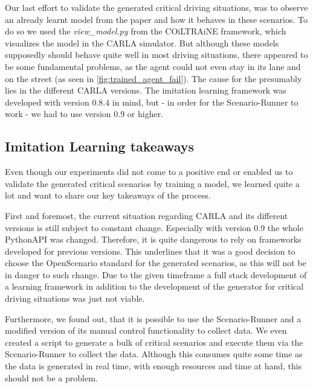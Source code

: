 \documentclass[conference, a4paper, 11pt]{IEEEtran}
\begin{document}
Our last effort to validate the generated critical driving situations, was to observe an already learnt model from the paper  \cite{Codevilla:OnOfflineEvaluation} and how it behaves in these scenarios. To do so we used the \textit{view\_model.py} from the COiLTRAiNE framework, which visualizes the model in the CARLA simulator. But although these models supposedly should behave quite well in most driving situations, there appeared to be some fundamental problems, as the agent could not even stay in its lane and on the street (as seen in \autoref{fig:trained_agent_fail}). The cause for the presumably lies in the different CARLA versions. The imitation learning framework was developed with version 0.8.4 in mind, but - in order for the Scenario-Runner to work - we had to use version 0.9 or higher.

\subsection{Imitation Learning takeaways}

Even though our experiments did not come to a positive end or enabled us to validate the generated critical scenarios by training a model, we learned quite a lot and want to share our key takeaways of the process.

First and foremost, the current situation regarding CARLA and its different versions is still subject to constant change. Especially with version 0.9 the whole PythonAPI was changed. Therefore, it is quite dangerous to rely on frameworks developed for previous versions. This underlines that it was a good decision to choose the OpenScenario standard for the generated scenarios, as this will not be in danger to such change.
Due to the given timeframe a full stack development of a learning framework in addition to the development of the generator for critical driving situations was just not viable.

Furthermore, we found out, that it is possible to use the Scenario-Runner and a modified version of its manual control functionality to collect data. We even created a script to generate a bulk of critical scenarios and execute them via the Scenario-Runner to collect the data.
Although this consumes quite some time as the data is generated in real time, with enough resources and time at hand, this should not be a problem.
\end{document}
